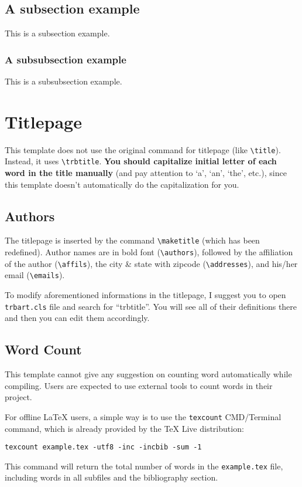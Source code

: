 \documentclass[12pt]{trbart}
\begin{document}
\subsection{A subsection example}
This is a subsection example.

\subsubsection{A subsubsection example}
This is a subsubsection example.


\section{Titlepage}
This template does not use the original command for titlepage (like \verb+\title+). Instead, it uses \verb+\trbtitle+. \textbf{You should capitalize initial letter of each word in the title manually} (and pay attention to `a', `an', `the', etc.), since this template doesn't automatically do the capitalization for you.

\subsection{Authors}
The titlepage is inserted by the command \verb+\maketitle+ (which has been redefined). Author names are in bold font (\verb+\authors+), followed by the affiliation of the author (\verb+\affils+), the city \& state with zipcode (\verb+\addresses+), and his/her email (\verb+\emails+). 

To modify aforementioned informations in the titlepage, I suggest you to open \texttt{trbart.cls} file and search for ``trbtitle''. You will see all of their definitions there and then you can edit them accordingly. 

\subsection{Word Count}
This template cannot give any suggestion on counting word automatically while compiling. Users are expected to use external tools to count words in their project. 

For offline LaTeX users, a simple way is to use the \texttt{texcount} CMD/Terminal command, which is already provided by the TeX Live distribution:
\begin{verbatim}
texcount example.tex -utf8 -inc -incbib -sum -1 
\end{verbatim}
This command will return the total number of words in the \texttt{example.tex} file, including words in all subfiles and the bibliography section.
\end{document}
